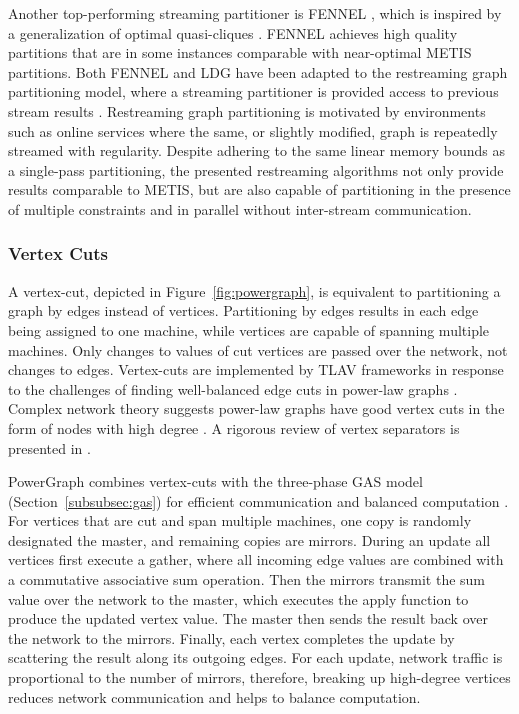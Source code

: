 \documentclass[reprint,twocolumn,showpacs,preprintnumbers,amsmath, aps,pre,amssymb]{revtex4-1}
\begin{document}
Another top-performing streaming partitioner is FENNEL \cite{Tsourakakis2014}, which is inspired by a generalization of optimal quasi-cliques \cite{Tsourakakis2013}.  FENNEL achieves high quality partitions that are in some instances comparable with near-optimal METIS partitions.  Both FENNEL and LDG have been adapted to the restreaming graph partitioning model, where a streaming partitioner is provided access to previous stream results \cite{Nishimura2013}.  Restreaming graph partitioning is motivated by environments such as online services where the same, or slightly modified, graph is repeatedly streamed with regularity.  Despite adhering to the same linear memory bounds as a single-pass partitioning, the presented restreaming algorithms not only provide results comparable to METIS, but are also capable of partitioning in the presence of multiple constraints and in parallel without inter-stream communication.

\subsubsection{Vertex Cuts}
\label{subsubsec:vert_cuts}
A vertex-cut, depicted in Figure~\ref{fig:powergraph}, is equivalent to partitioning a graph by edges instead of vertices.  Partitioning by edges results in each edge being assigned to one machine, while vertices are capable of spanning multiple machines.  Only changes to values of cut vertices are passed over the network, not changes to edges. Vertex-cuts are implemented by TLAV frameworks in response to the challenges of finding well-balanced edge cuts in power-law graphs \cite{Abou-Rjeili2006,Leskovec2009}.  Complex network theory suggests power-law graphs have good vertex cuts in the form of nodes with high degree \cite{Albert2000}. A rigorous review of vertex separators is presented in \cite{Feige2008}.

PowerGraph combines vertex-cuts with the three-phase GAS model (Section~\ref{subsubsec:gas}) for efficient communication and balanced computation \cite{Gonzalez2012}.  For vertices that are cut and span multiple machines, one copy is randomly designated the master, and remaining copies are mirrors.  During an update all vertices first execute a gather, where all incoming edge values are combined with a commutative associative sum operation.  Then the mirrors transmit the sum value over the network to the master, which executes the apply function to produce the updated vertex value. The master then sends the result back over the network to the mirrors.  Finally, each vertex completes the update by scattering the result along its outgoing edges.  For each update, network traffic is proportional to the number of mirrors, therefore, breaking up high-degree vertices reduces network communication and helps to balance computation. 
\end{document}
